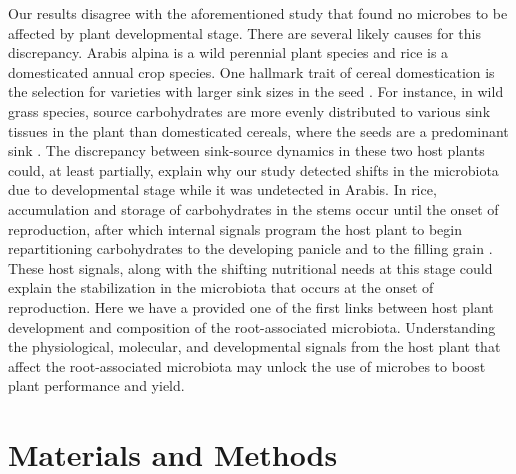 Our results disagree with the aforementioned study that found no microbes to be affected by plant developmental stage. There are several likely causes for this discrepancy. Arabis alpina is a wild perennial plant species and rice is a domesticated annual crop species. One hallmark trait of cereal domestication is the selection for varieties with larger sink sizes in the seed \cite{Ishimaru2013}. For instance, in wild grass species, source carbohydrates are more evenly distributed to various sink tissues in the plant than domesticated cereals, where the seeds are a predominant sink \cite{Shomura2008,Ishimaru2013}. The discrepancy between sink-source dynamics in these two host plants could, at least partially, explain why our study detected shifts in the microbiota due to developmental stage while it was undetected in Arabis. In rice, accumulation and storage of carbohydrates in the stems occur until the onset of reproduction, after which internal signals program the host plant to begin repartitioning carbohydrates to the developing panicle and to the filling grain \cite{Slewinski2012,Scofield2009}. These host signals, along with the shifting nutritional needs at this stage could explain the stabilization in the microbiota that occurs at the onset of reproduction. Here we have a provided one of the first links between host plant development and composition of the root-associated microbiota. Understanding the physiological, molecular, and developmental signals from the host plant that affect the root-associated microbiota may unlock the use of microbes to boost plant performance and yield.
	
\section{Materials and Methods}
%
